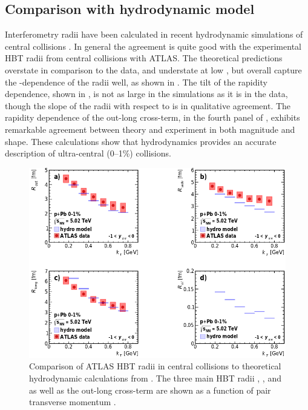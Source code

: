 \subsection{Comparison with hydrodynamic model}

Interferometry radii have been calculated in recent hydrodynamic simulations of central \pPb collisions \cite{Bozek:2017bwp}.
In general the agreement is quite good with the experimental HBT radii from central collisions with ATLAS.
The theoretical predictions overstate \Rside in comparison to the data, and understate \Rlong at low \kt, but overall capture the \kt-dependence of the radii well, as shown in .
The tilt of the rapidity dependence, shown in , is not as large in the simulations as it is in the data, though the slope of the radii with respect to \kys is in qualitative agreement.
The rapidity dependence of the out-long cross-term, in the fourth panel of , exhibits remarkable agreement between theory and experiment in both magnitude and shape.
These calculations show that hydrodynamics provides an accurate description of ultra-central (0--1\%) \pPb collisions.

\begin{figure}[t]
\centering
\includegraphics[width=\linewidth]{theory_bozek_kt.png}
\caption{Comparison of ATLAS HBT radii in central \pPb collisions to theoretical hydrodynamic calculations from . The three main HBT radii \Rout, \Rside, and \Rlong as well as the out-long cross-term \Rol are shown as a function of pair transverse momentum \kt.}
\label{fig:results_theory_kt}
\end{figure}


